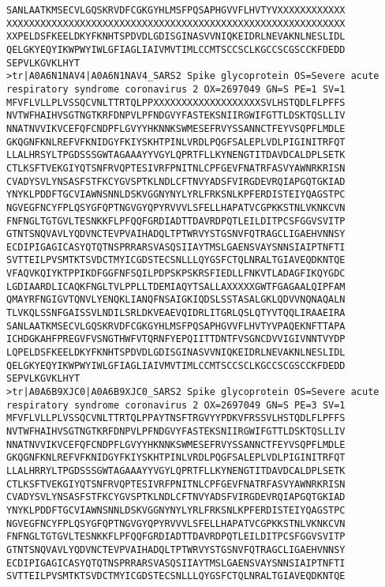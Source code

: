 \documentclass[en,black,12pt,normal]{elegantnote}
\begin{document}
\begin{lstlisting}
SANLAATKMSECVLGQSKRVDFCGKGYHLMSFPQSAPHGVVFLHVTYVXXXXXXXXXXXX
XXXXXXXXXXXXXXXXXXXXXXXXXXXXXXXXXXXXXXXXXXXXXXXXXXXXXXXXXXXX
XXPELDSFKEELDKYFKNHTSPDVDLGDISGINASVVNIQKEIDRLNEVAKNLNESLIDL
QELGKYEQYIKWPWYIWLGFIAGLIAIVMVTIMLCCMTSCCSCLKGCCSCGSCCKFDEDD
SEPVLKGVKLHYT
>tr|A0A6N1NAV4|A0A6N1NAV4_SARS2 Spike glycoprotein OS=Severe acute respiratory syndrome coronavirus 2 OX=2697049 GN=S PE=1 SV=1
MFVFLVLLPLVSSQCVNLTTRTQLPPXXXXXXXXXXXXXXXXXXXSVLHSTQDLFLPFFS
NVTWFHAIHVSGTNGTKRFDNPVLPFNDGVYFASTEKSNIIRGWIFGTTLDSKTQSLLIV
NNATNVVIKVCEFQFCNDPFLGVYYHKNNKSWMESEFRVYSSANNCTFEYVSQPFLMDLE
GKQGNFKNLREFVFKNIDGYFKIYSKHTPINLVRDLPQGFSALEPLVDLPIGINITRFQT
LLALHRSYLTPGDSSSGWTAGAAAYYVGYLQPRTFLLKYNENGTITDAVDCALDPLSETK
CTLKSFTVEKGIYQTSNFRVQPTESIVRFPNITNLCPFGEVFNATRFASVYAWNRKRISN
CVADYSVLYNSASFSTFKCYGVSPTKLNDLCFTNVYADSFVIRGDEVRQIAPGQTGKIAD
YNYKLPDDFTGCVIAWNSNNLDSKVGGNYNYLYRLFRKSNLKPFERDISTEIYQAGSTPC
NGVEGFNCYFPLQSYGFQPTNGVGYQPYRVVVLSFELLHAPATVCGPKKSTNLVKNKCVN
FNFNGLTGTGVLTESNKKFLPFQQFGRDIADTTDAVRDPQTLEILDITPCSFGGVSVITP
GTNTSNQVAVLYQDVNCTEVPVAIHADQLTPTWRVYSTGSNVFQTRAGCLIGAEHVNNSY
ECDIPIGAGICASYQTQTNSPRRARSVASQSIIAYTMSLGAENSVAYSNNSIAIPTNFTI
SVTTEILPVSMTKTSVDCTMYICGDSTECSNLLLQYGSFCTQLNRALTGIAVEQDKNTQE
VFAQVKQIYKTPPIKDFGGFNFSQILPDPSKPSKRSFIEDLLFNKVTLADAGFIKQYGDC
LGDIAARDLICAQKFNGLTVLPPLLTDEMIAQYTSALLAXXXXXGWTFGAGAALQIPFAM
QMAYRFNGIGVTQNVLYENQKLIANQFNSAIGKIQDSLSSTASALGKLQDVVNQNAQALN
TLVKQLSSNFGAISSVLNDILSRLDKVEAEVQIDRLITGRLQSLQTYVTQQLIRAAEIRA
SANLAATKMSECVLGQSKRVDFCGKGYHLMSFPQSAPHGVVFLHVTYVPAQEKNFTTAPA
ICHDGKAHFPREGVFVSNGTHWFVTQRNFYEPQIITTDNTFVSGNCDVVIGIVNNTVYDP
LQPELDSFKEELDKYFKNHTSPDVDLGDISGINASVVNIQKEIDRLNEVAKNLNESLIDL
QELGKYEQYIKWPWYIWLGFIAGLIAIVMVTIMLCCMTSCCSCLKGCCSCGSCCKFDEDD
SEPVLKGVKLHYT
>tr|A0A6B9XJC0|A0A6B9XJC0_SARS2 Spike glycoprotein OS=Severe acute respiratory syndrome coronavirus 2 OX=2697049 GN=S PE=3 SV=1
MFVFLVLLPLVSSQCVNLTTRTQLPPAYTNSFTRGVYYPDKVFRSSVLHSTQDLFLPFFS
NVTWFHAIHVSGTNGTKRFDNPVLPFNDGVYFASTEKSNIIRGWIFGTTLDSKTQSLLIV
NNATNVVIKVCEFQFCNDPFLGVYYHKNNKSWMESEFRVYSSANNCTFEYVSQPFLMDLE
GKQGNFKNLREFVFKNIDGYFKIYSKHTPINLVRDLPQGFSALEPLVDLPIGINITRFQT
LLALHRRYLTPGDSSSGWTAGAAAYYVGYLQPRTFLLKYNENGTITDAVDCALDPLSETK
CTLKSFTVEKGIYQTSNFRVQPTESIVRFPNITNLCPFGEVFNATRFASVYAWNRKRISN
CVADYSVLYNSASFSTFKCYGVSPTKLNDLCFTNVYADSFVIRGDEVRQIAPGQTGKIAD
YNYKLPDDFTGCVIAWNSNNLDSKVGGNYNYLYRLFRKSNLKPFERDISTEIYQAGSTPC
NGVEGFNCYFPLQSYGFQPTNGVGYQPYRVVVLSFELLHAPATVCGPKKSTNLVKNKCVN
FNFNGLTGTGVLTESNKKFLPFQQFGRDIADTTDAVRDPQTLEILDITPCSFGGVSVITP
GTNTSNQVAVLYQDVNCTEVPVAIHADQLTPTWRVYSTGSNVFQTRAGCLIGAEHVNNSY
ECDIPIGAGICASYQTQTNSPRRARSVASQSIIAYTMSLGAENSVAYSNNSIAIPTNFTI
SVTTEILPVSMTKTSVDCTMYICGDSTECSNLLLQYGSFCTQLNRALTGIAVEQDKNTQE

\end{lstlisting}
\end{document}
